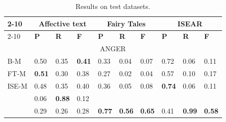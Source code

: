 \documentclass[11pt]{article}
\begin{document}
\begin{table}[ht]
\caption{Results on test datasets.\label{final_results}}
\centering
\begin{tabular}{|l||l|l|l||l|l|l||l|l|l|}
\cline{2-10}
    \multicolumn{1}{}{{}} & 
    \multicolumn{3}{|c||}{{Affective text}} & 
    \multicolumn{3}{|c||}{{Fairy Tales}} & 
    \multicolumn{3}{|c|}{{ISEAR}}  \\
        
\cline{2-10}
\cline{2-10}                      
     \multicolumn{1}{c|}{{}} & 
    \textbf{P} & 
    \textbf{R} & 
    \textbf{F} & 
    \textbf{P} & 
    \textbf{R} & 
    \textbf{F} & 
    \textbf{P} & 
    \textbf{R} & 
    \textbf{F} \\ 
     
\hline                      

    \multicolumn{10}{|c|}{{ ANGER}} \\                 

                                        \hline
    \tiny{B-M} & 
    \footnotesize{0.50} & 
    \footnotesize{0.35} & 
    \footnotesize{\textbf{0.41}} & 
    \footnotesize{0.33} & 
    \footnotesize{0.04} & 
    \footnotesize{0.07} & 
    \footnotesize{0.72} & 
    \footnotesize{0.06} & 
    \footnotesize{0.11} \\ 

\hline
    \tiny{FT-M} & 
    \footnotesize{\textbf{0.51}} & 
    \footnotesize{0.30} & 
    \footnotesize{0.38} &
    \footnotesize{0.27} & 
    \footnotesize{0.02} & 
    \footnotesize{0.04} & 
    \footnotesize{0.57} & 
    \footnotesize{0.10} & 
    \footnotesize{0.17} \\ 

\hline
    \tiny{ISE-M} & 
    \footnotesize{0.48} & 
    \footnotesize{0.35} & 
    \footnotesize{0.40} & 
    \footnotesize{0.36} & 
    \footnotesize{0.05} & 
    \footnotesize{0.08} & 
    \footnotesize{\textbf{0.74}} & 
    \footnotesize{0.06} & 
    \footnotesize{0.11} \\ 


\hline
    \tiny{\cite{strapparava2008learning} } &
    \footnotesize{0.06} & 
    \footnotesize{\textbf{0.88}} & 
    \footnotesize{0.12} &
    &
    &
    &
    &
    &
    \\

\hline
    \tiny{\cite{kim2010evaluation} } &
    \footnotesize{0.29} & 
    \footnotesize{0.26} & 
    \footnotesize{{0.28}} &
    \footnotesize{\textbf{0.77}} & 
    \footnotesize{\textbf{0.56}} & 
    \footnotesize{\textbf{0.65}} &
    \footnotesize{0.41} & 
    \footnotesize{\textbf{0.99}} & 
    \footnotesize{\textbf{0.58}} \\
    

\end{tabular}
\end{table}
\end{document}
